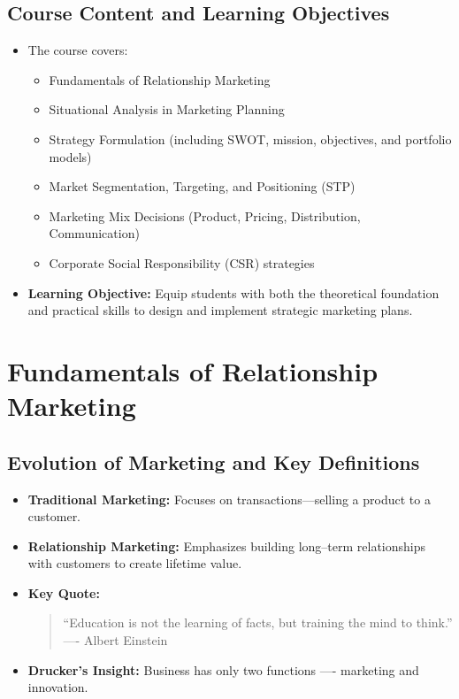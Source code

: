 \documentclass[12pt,a4paper]{report}
\begin{document}
\section{Course Content and Learning Objectives}
\begin{itemize}
    \item The course covers:
    \begin{itemize}
         \item Fundamentals of Relationship Marketing
         \item Situational Analysis in Marketing Planning
         \item Strategy Formulation (including SWOT, mission, objectives, and portfolio models)
         \item Market Segmentation, Targeting, and Positioning (STP)
         \item Marketing Mix Decisions (Product, Pricing, Distribution, Communication)
         \item Corporate Social Responsibility (CSR) strategies
    \end{itemize}
    \item \textbf{Learning Objective:} Equip students with both the theoretical foundation and practical skills to design and implement strategic marketing plans.
\end{itemize}

\chapter{Fundamentals of Relationship Marketing}

\section{Evolution of Marketing and Key Definitions}
\begin{itemize}
    \item \textbf{Traditional Marketing:} Focuses on transactions—selling a product to a customer.
    \item \textbf{Relationship Marketing:} Emphasizes building long--term relationships with customers to create lifetime value.
    \item \textbf{Key Quote:} 
        \begin{quote}
            ``Education is not the learning of facts, but training the mind to think.'' 
            \\ \hfill ---- Albert Einstein
        \end{quote}
    \item \textbf{Drucker’s Insight:} Business has only two functions ---- marketing and innovation.
\end{itemize}
\end{document}
